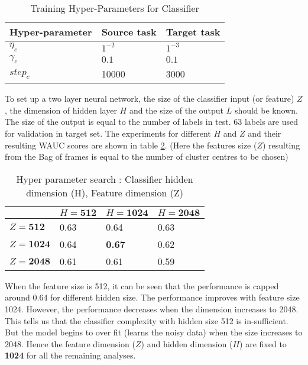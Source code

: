 \begin{table}[H]
\label{tab:a2}
\centering
\begin{tabular}{| p{} | p{} | p{} |}
\hline
\textbf{Hyper-parameter} & \textbf{Source task} & \textbf{Target task}\\
\hline
${\eta}_{c}$ & $1^{-2}$ & $1^{-3}$ \\ 
\hline
${\gamma}_{c}$ & $0.1$ & $ 0.1$\\
\hline
${step}_{c}$ & 10000 & 3000 \\
\hline
\end{tabular}
\caption{Training Hyper-Parameters for Classifier} 
\end{table}
\FloatBarrier

\noindent To set up a two layer neural network, the size of the classifier input (or feature) $Z$, the dimension of hidden layer $H$ and the size of the output $L$ should be known. The size of the output is equal to the number of labels in test. 63 labels are used for validation in target set. The experiments for different $H$ and $Z$ and their resulting WAUC scores are shown in table \ref{tab:a3}. (Here the features size ($Z$) resulting from the Bag of frames is equal to the number of cluster centres to be chosen)
 
\begin{table}[H]
\label{tab:a3}
\centering
\begin{tabular}{| p{} | p{}| p{}| p{} |}
\hline
& $H = \textbf{512}$ & $H = \textbf{1024}$ & $H = \textbf{2048}$\\
\hline
$Z = \textbf{512}$  & 0.63 & 0.64 & 0.63\\
\hline
$Z = \textbf{1024}$ & 0.64 & \textbf{0.67 }& 0.62\\ 
\hline
$Z = \textbf{2048}$ & 0.61 & 0.61 & 0.59\\
\hline
\end{tabular}
\caption{Hyper parameter search : Classifier hidden dimension (H), Feature dimension (Z)} 
\end{table}
\FloatBarrier

\noindent When the feature size is 512, it can be seen that the performance is capped around 0.64 for different hidden size. The performance improves with feature size 1024. However, the performance decreases when the dimension increases to 2048. This tells us that the classifier complexity with hidden size 512 is in-sufficient. But the model begins to over fit (learns the noisy data) when the size increases to 2048. Hence the feature dimension ($Z$) and hidden dimension ($H$) are fixed to \textbf{1024} for all the remaining analyses. 

